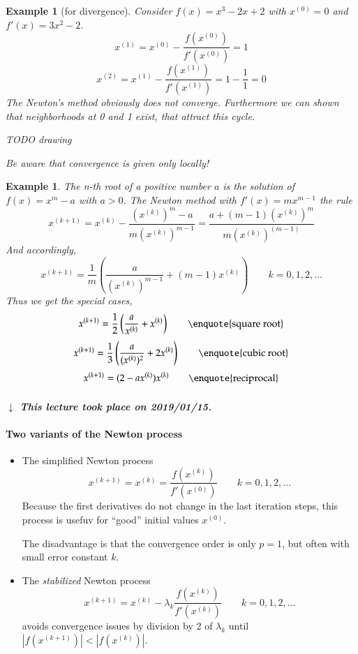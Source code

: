 \documentclass[a4paper]{article}
\newcounter{lecref}[section]
\numberwithin{lecref}{section}
\theoremstyle{break}
\newtheorem{example}[lecref]{Example}
\newcommand{\dateref}[1]{%
  \begin{mdframed}[backgroundcolor=gray!10,innerbottommargin=0pt,innertopmargin=0pt]
    \paragraph{\textit{$\downarrow$ This lecture took place on #1.}}%
  \end{mdframed}%
}
\newcommand{\Abs}[1]{\left|#1\right|}
\begin{document}
\begin{example}[for divergence]
  Consider $f(x) = x^3 - 2x + 2$ with $x^{(0)} = 0$ and $f'(x) = 3x^2 - 2$.
  \[ x^{(1)} = x^{(0)} - \frac{f(x^{(0)})}{f'(x^{(0)})} = 1 \]
  \[ x^{(2)} = x^{(1)} - \frac{f(x^{(1)})}{f'(x^{(1)})} = 1 - \frac11 = 0 \]
  The Newton's method obviously does not converge.
  Furthermore we can shown that neighborhoods at 0 and 1 exist, that attract this cycle.

  TODO drawing

  Be aware that convergence is given only locally!
\end{example}

\begin{example}
  \label{example:6-8}
  The n-th root of a positive number $a$ is the solution of $f(x) = x^m - a$ with $a > 0$.
  The Newton method with $f'(x) = mx^{m-1}$ the rule
  \[ x^{(k+1)} = x^{(k)} - \frac{(x^{(k)})^m - a}{m(x^{(k)})^{m-1}} = \frac{a + (m - 1) (x^{(k)})^m}{m (x^{(k)})^{(m-1)}} \]
  And accordingly,
  \[ x^{(k + 1)} = \frac1m \left(\frac{a}{(x^{(k)})^{m-1}} + (m-1) x^{(k)}\right) \qquad k = 0, 1, 2, \dots \]
  Thus we get the special cases,
  \[ x^{(k+1)} = \frac12 \left(\frac{a}{x^{(k)}} + x^{(k)}\right) \qquad \text{\enquote{square root}} \]
  \[ x^{(k+1)} = \frac13 \left(\frac{a}{(x^{(k)})^2} + 2x^{(k)}\right) \qquad \text{\enquote{cubic root}} \]
  \[ x^{(k+1)} = (2 - ax^{(k)}) x^{(k)} \qquad \text{\enquote{reciprocal}} \]
\end{example}

\dateref{2019/01/15}

\paragraph{Two variants of the Newton process}


\begin{itemize}
  \item The simplified Newton process
    \[ x^{(k+1)} = x^{(k)} = \frac{f(x^{(k)})}{f'(x^{(0)})} \qquad k = 0, 1, 2, \dots \]
    Because the first derivatives do not change in the last iteration steps, this process is usefuv for \enquote{good} initial values $x^{(0)}$.

    The disadvantage is that the convergence order is only $p = 1$,
    but often with small error constant $k$.
  \item The \emph{stabilized} Newton process
    \[ x^{(k+1)} = x^{(k)} - \lambda_k \frac{f(x^{(k)})}{f'(x^{(k)})} \qquad k = 0, 1, 2, \dots \]
    avoids convergence issues by division by 2 of $\lambda_k$ until $\Abs{f(x^{(k+1)})} < \Abs{f(x^{(k)})}$.
\end{itemize}
\end{document}
